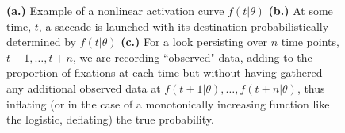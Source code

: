 \documentclass{article}
\begin{document}
\begin{figure}[H]
    \centering
    \caption{ \textbf{(a.)} Example of a nonlinear activation curve $f(t|\theta)$ \textbf{(b.)} At some time, $t$, a saccade is launched with its destination probabilistically determined by $f(t|\theta)$ \textbf{(c.)} For a look persisting over $n$ time points, $t+1, \dots, t+n$, we are recording ``observed" data, adding to the proportion of fixations at each time but without having gathered any additional observed data at $f(t+1 | \theta), \dots,f(t+n | \theta)$, thus inflating (or in the case of a monotonically increasing function like the logistic, deflating) the true probability. }
\label{fig:folly_of_fixation}
\end{figure}
\end{document}
